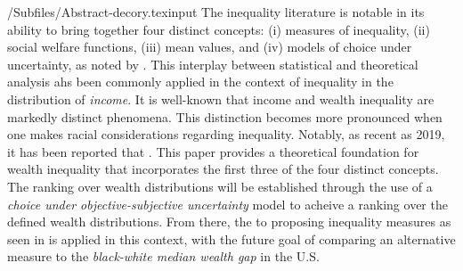 \documentclass[IneqMeas]{subfiles}
\begin{document}



\author{Decory Edwards\authNum}

\keywords{}


\renewcommand{\forcedate}{May 8, 2022}\date{\forcedate}

\maketitle
\hypertarget{abstract}{}
\begin{verbatimwrite}{\econtexRoot/Subfiles/Abstract-decory.texinput}
 The inequality literature is notable in its ability to bring together four distinct concepts: (i) measures of inequality, (ii) social welfare functions, (iii) mean values, and (iv) models of choice under uncertainty, as noted by \cite{hd20}. This interplay between statistical and theoretical analysis ahs been commonly applied in the context of inequality in the distribution of \textit{income}. It is well-known that income and wealth inequality are markedly distinct phenomena. This distinction becomes more pronounced when one makes racial considerations regarding inequality. Notably, as recent as 2019, it has been reported that . This paper provides a theoretical foundation for wealth inequality that incorporates the first three of the four distinct concepts. The ranking over wealth distributions will be established through the use of a \textit{choice under objective-subjective uncertainty} model to acheive a ranking over the defined wealth distributions. From there, the  to proposing inequality measures as seen in \cite{aa71} is applied in this context, with the future goal of comparing an alternative measure to the \textit{black-white median wealth gap} in the U.S.
\end{verbatimwrite}

\end{document}
